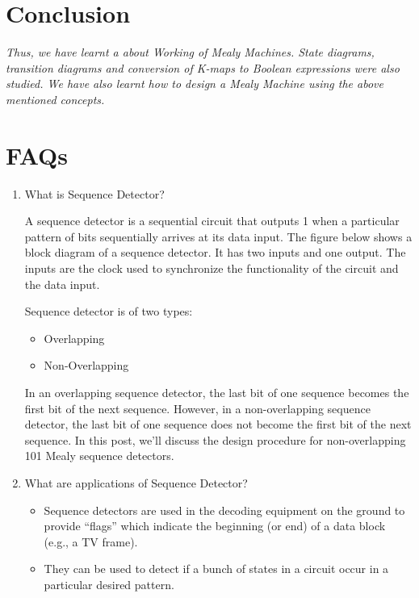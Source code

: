 \documentclass[11pt]{article}
\begin{document}
\section{Conclusion}
\textit{Thus, we have learnt a about Working of Mealy Machines. State diagrams, transition diagrams and conversion of K-maps to Boolean expressions were also studied. We have also learnt how to design a Mealy Machine using the above mentioned concepts.}
\pagebreak

\section{FAQs}

\begin{enumerate}
	\item What is Sequence Detector?

	      A sequence detector is a sequential circuit that outputs 1 when a particular pattern of bits sequentially arrives at its data input. The figure below shows a block diagram of a sequence detector. It has two inputs and one output. The inputs are the clock used to synchronize the functionality of the circuit and the data input.

	      Sequence detector is of two types:
	      \begin{itemize}
		      \item Overlapping
		      \item Non-Overlapping
	      \end{itemize}

	      In an overlapping sequence detector, the last bit of one sequence becomes the first bit of the next sequence. However, in a non-overlapping sequence detector, the last bit of one sequence does not become the first bit of the next sequence. In this post, we'll discuss the design procedure for non-overlapping 101 Mealy sequence detectors.

	\item What are applications of Sequence Detector?

	      \begin{itemize}
		      \item Sequence detectors are used in the decoding equipment on the ground to provide “flags” which indicate the beginning (or end) of a data block (e.g., a TV frame).
		      \item They can be used to detect if a bunch of states in a circuit occur in a particular desired pattern.

	      \end{itemize}

\end{enumerate}
\end{document}
